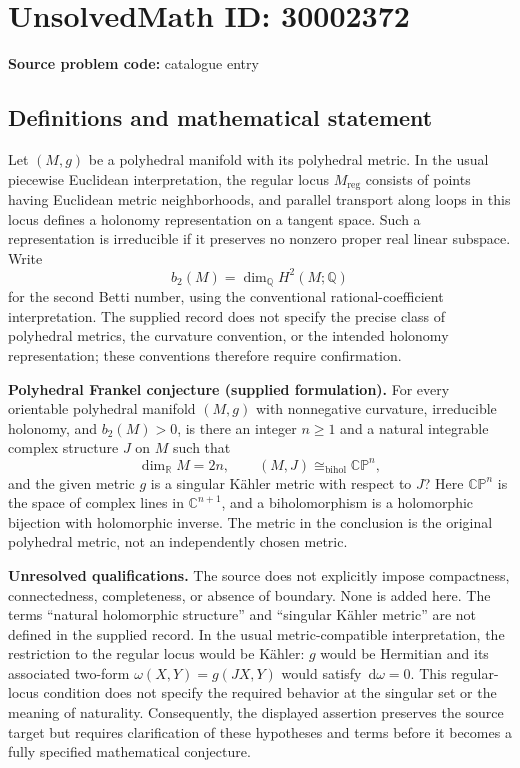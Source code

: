 \documentclass[11pt]{article}
\newcommand{\Q}{\mathbb{Q}}
\newcommand{\R}{\mathbb{R}}
\newcommand{\C}{\mathbb{C}}
\newcommand{\dd}{\,\mathrm{d}}
\begin{document}
\section*{UnsolvedMath ID: 30002372}
\textbf{Source problem code:} catalogue entry
\subsection{Definitions and mathematical statement}
Let \((M,g)\) be a polyhedral manifold with its polyhedral metric. In the usual piecewise Euclidean interpretation, the regular locus \(M_{\mathrm{reg}}\) consists of points having Euclidean metric neighborhoods, and parallel transport along loops in this locus defines a holonomy representation on a tangent space. Such a representation is irreducible if it preserves no nonzero proper real linear subspace. Write
\[
 b_2(M)=\dim_{\Q}H^2(M;\Q)
\]
for the second Betti number, using the conventional rational-coefficient interpretation. The supplied record does not specify the precise class of polyhedral metrics, the curvature convention, or the intended holonomy representation; these conventions therefore require confirmation.

\textbf{Polyhedral Frankel conjecture (supplied formulation).} For every orientable polyhedral manifold \((M,g)\) with nonnegative curvature, irreducible holonomy, and \(b_2(M)>0\), is there an integer \(n\geq 1\) and a natural integrable complex structure \(J\) on \(M\) such that
\[
 \dim_{\R}M=2n,
 \qquad (M,J)\cong_{\mathrm{bihol}}\mathbb{CP}^{n},
\]
and the given metric \(g\) is a singular K\"ahler metric with respect to \(J\)? Here \(\mathbb{CP}^{n}\) is the space of complex lines in \(\C^{n+1}\), and a biholomorphism is a holomorphic bijection with holomorphic inverse. The metric in the conclusion is the original polyhedral metric, not an independently chosen metric.

\textbf{Unresolved qualifications.} The source does not explicitly impose compactness, connectedness, completeness, or absence of boundary. None is added here. The terms ``natural holomorphic structure'' and ``singular K\"ahler metric'' are not defined in the supplied record. In the usual metric-compatible interpretation, the restriction to the regular locus would be K\"ahler: \(g\) would be Hermitian and its associated two-form \(\omega(X,Y)=g(JX,Y)\) would satisfy \(\dd\omega=0\). This regular-locus condition does not specify the required behavior at the singular set or the meaning of naturality. Consequently, the displayed assertion preserves the source target but requires clarification of these hypotheses and terms before it becomes a fully specified mathematical conjecture.
\end{document}
